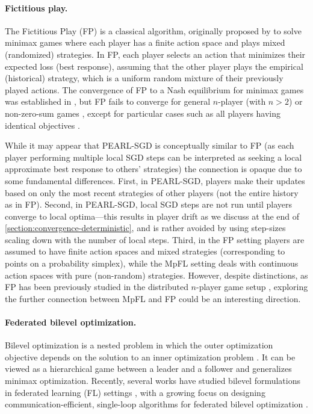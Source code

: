 \documentclass{article}
\newcommand{\algname}[1]{{\color{PineGreen}\sf  #1}\xspace}
\newcommand{\abbvname}{\algname{PEARL-SGD}}
\theoremstyle{plain}
\theoremstyle{remark}
\begin{document}
\paragraph{Fictitious play.} 
The Fictitious Play (FP) is a classical algorithm, originally proposed by \citep{Brown1949_notes} to solve minimax games where each player has a finite action space and plays mixed (randomized) strategies.
In FP, each player selects an action that minimizes their expected loss (best response), assuming that the other player plays the empirical (historical) strategy, which is a uniform random mixture of their previously played actions.
The convergence of FP to a Nash equilibrium for minimax games was established in \citep{Robinson1951_iterative}, but FP fails to converge for general $n$-player (with $n>2$) or non-zero-sum games \citep{shapley1963some, jordan1993three}, except for particular cases such as all players having identical objectives \citep{monderershapley1996_fictitious}.

While it may appear that \abbvname is conceptually similar to FP (as each player performing multiple local SGD steps can be interpreted as seeking a local approximate best response to others' strategies) the connection is opaque due to some fundamental differences.
First, in \abbvname, players make their updates based on only the most recent strategies of other players (not the entire history as in FP).
Second, in \abbvname, local SGD steps are not run until players converge to local optima---this results in player drift as we discuss at the end of \cref{section:convergence-deterministic}, and is rather avoided by using step-sizes scaling down with the number of local steps.
Third, in the FP setting players are assumed to have finite action spaces and mixed strategies (corresponding to points on a probability simplex), while the MpFL setting deals with continuous action spaces with pure (non-random) strategies.
However, despite distinctions, as FP has been previously studied in the distributed $n$-player game setup \citep{ShammaArslan2005_dynamic}, exploring the further connection between MpFL and FP could be an interesting direction.

\paragraph{Federated bilevel optimization.}
Bilevel optimization is a nested problem in which the outer optimization objective depends on the solution to an inner optimization problem \cite{bracken1973mathematical, aiyoshi1981hierarchical}.
It can be viewed as a hierarchical game between a leader and a follower and generalizes minimax optimization.
Recently, several works have studied bilevel formulations in federated learning (FL) settings \cite{tarzanagh2022fednest, huang2023achieving, li2023communicationefficient, qiu2023zerothorder}, with a growing focus on designing communication-efficient, single-loop algorithms for federated bilevel optimization \cite{yang2023simfbo, yang2025first}.
\end{document}
